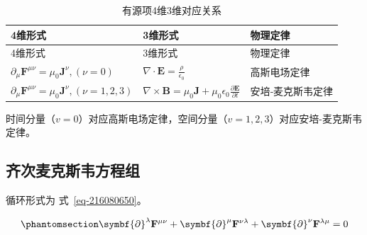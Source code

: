 \documentclass[
  chinese,
  a4paper,
  UTF8,
  12pt,
  oneside,
  openany]{ctexbook}
\begin{document}
\begin{longtable}[]{@{}
  >{\raggedright\arraybackslash}p{}
  >{\raggedright\arraybackslash}p{}
  >{\raggedright\arraybackslash}p{}@{}}
\caption{有源项4维3维对应关系}\label{tbl-tab-sourceful}\tabularnewline
\toprule\noalign{}
\begin{minipage}[b]{\linewidth}\raggedright
4维形式
\end{minipage} & \begin{minipage}[b]{\linewidth}\raggedright
3维形式
\end{minipage} & \begin{minipage}[b]{\linewidth}\raggedright
物理定律
\end{minipage} \\
\midrule\noalign{}
\endfirsthead
\toprule\noalign{}
\begin{minipage}[b]{\linewidth}\raggedright
4维形式
\end{minipage} & \begin{minipage}[b]{\linewidth}\raggedright
3维形式
\end{minipage} & \begin{minipage}[b]{\linewidth}\raggedright
物理定律
\end{minipage} \\
\midrule\noalign{}
\endhead
\bottomrule\noalign{}
\endlastfoot
\(\partial_{\mu}\mathbf{F}^{\mu\nu}=\mu_{0}\mathbf{J}^{\nu},(\nu = 0)\)
& \(\nabla \cdot \mathbf{E} = \frac{\rho}{\epsilon_{0}}\) &
高斯电场定律 \\
\(\partial_{\mu}\mathbf{F}^{\mu\nu}=\mu_{0}\mathbf{J}^{\nu},(\nu = 1,2,3)\)
&
\(\nabla \times \mathbf{B} = \mu_{0}\mathbf{J} + \mu_{0}\epsilon_{0}\frac{\partial\mathbf{E}}{\partial t}\)
& 安培‑麦克斯韦定律 \\
\end{longtable}

时间分量（\(v = 0\)）对应高斯电场定律，空间分量（\(v = 1,2,3\)）对应安培-麦克斯韦定律。

\subsection{齐次麦克斯韦方程组}\label{ux9f50ux6b21ux9ea6ux514bux65afux97e6ux65b9ux7a0bux7ec4}

循环形式为 式~\ref{eq-216080650}。

\begin{equation}\protect\phantomsection\label{eq-216080650}{
\symbf{\partial}^{\lambda}\mathbf{F}^{\mu\nu} + \symbf{\partial}^{\mu}\mathbf{F}^{\nu\lambda} + \symbf{\partial}^{\nu}\mathbf{F}^{\lambda\mu} = 0
}\end{equation}
\end{document}
